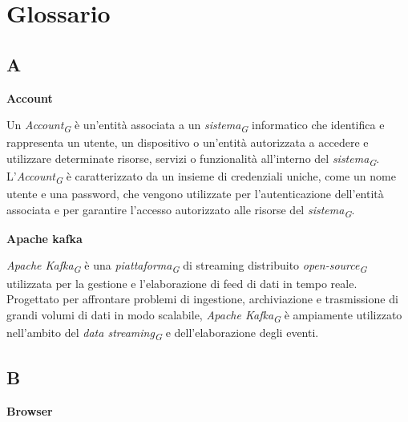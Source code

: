 \section{Glossario}\label{sec:glossario}

\subsection{A}

\vspace{0.4cm}

\textbf{Account}

\vspace{0.1cm}

Un \textit{Account}\textsubscript{\textit{G}} è un'entità associata a un \textit{sistema}\textsubscript{\textit{G}} informatico che identifica e rappresenta un utente, un dispositivo o un'entità autorizzata a accedere e utilizzare determinate risorse, servizi o funzionalità all'interno del \textit{sistema}\textsubscript{\textit{G}}. L'\textit{Account}\textsubscript{\textit{G}} è caratterizzato da un insieme di credenziali uniche, come un nome utente e una password, che vengono utilizzate per l'autenticazione dell'entità associata e per garantire l'accesso autorizzato alle risorse del \textit{sistema}\textsubscript{\textit{G}}.

\vspace{0.4cm}

\textbf{Apache kafka}

\vspace{0.1cm}

\textit{Apache Kafka}\textsubscript{\textit{G}} è una \textit{piattaforma}\textsubscript{\textit{G}} di streaming distribuito \textit{open-source}\textsubscript{\textit{G}} utilizzata per la gestione e l'elaborazione di feed di dati in tempo reale. Progettato per affrontare problemi di ingestione, archiviazione e trasmissione di grandi volumi di dati in modo scalabile, \textit{Apache Kafka}\textsubscript{\textit{G}} è ampiamente utilizzato nell'ambito del \textit{data streaming}\textsubscript{\textit{G}} e dell'elaborazione degli eventi.

\subsection{B}

\vspace{0.4cm}

\textbf{Browser}

